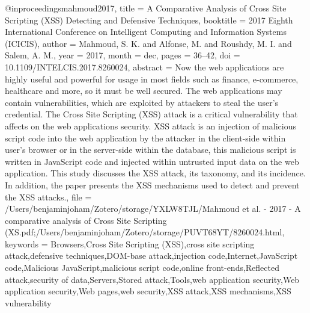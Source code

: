 @inproceedings{mahmoud2017,
  title = {A Comparative Analysis of {{Cross Site Scripting}} ({{XSS}}) Detecting and Defensive Techniques},
  booktitle = {2017 {{Eighth International Conference}} on {{Intelligent Computing}} and {{Information Systems}} ({{ICICIS}})},
  author = {Mahmoud, S. K. and Alfonse, M. and Roushdy, M. I. and Salem, A. M.},
  year = {2017},
  month = dec,
  pages = {36--42},
  doi = {10.1109/INTELCIS.2017.8260024},
  abstract = {Now the web applications are highly useful and powerful for usage in most fields such as finance, e-commerce, healthcare and more, so it must be well secured. The web applications may contain vulnerabilities, which are exploited by attackers to steal the user's credential. The Cross Site Scripting (XSS) attack is a critical vulnerability that affects on the web applications security. XSS attack is an injection of malicious script code into the web application by the attacker in the client-side within user's browser or in the server-side within the database, this malicious script is written in JavaScript code and injected within untrusted input data on the web application. This study discusses the XSS attack, its taxonomy, and its incidence. In addition, the paper presents the XSS mechanisms used to detect and prevent the XSS attacks.},
  file = {/Users/benjaminjoham/Zotero/storage/YXLW8TJL/Mahmoud et al. - 2017 - A comparative analysis of Cross Site Scripting (XS.pdf;/Users/benjaminjoham/Zotero/storage/PUVT68YT/8260024.html},
  keywords = {Browsers,Cross Site Scripting (XSS),cross site scripting attack,defensive techniques,DOM-base attack,injection code,Internet,JavaScript code,Malicious JavaScript,malicious script code,online front-ends,Reflected attack,security of data,Servers,Stored attack,Tools,web application security,Web application security,Web pages,web security,XSS attack,XSS mechanisms,XSS vulnerability}
}

